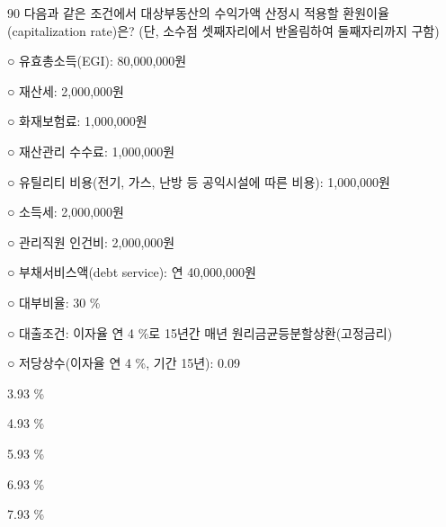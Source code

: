 \begin{question}{90}
다음과 같은 조건에서 대상부동산의 수익가액 산정시 적용할 환원이율(capitalization rate)은? (단, 소수점 셋째자리에서 반올림하여 둘째자리까지 구함)
\begin{framedtext}
○ 유효총소득(EGI): 80,000,000원 \par
○ 재산세: 2,000,000원 \par
○ 화재보험료: 1,000,000원 \par
○ 재산관리 수수료: 1,000,000원 \par
○ 유틸리티 비용(전기, 가스, 난방 등 공익시설에 따른 비용): 1,000,000원 \par
○ 소득세: 2,000,000원 \par
○ 관리직원 인건비: 2,000,000원 \par
○ 부채서비스액(debt service): 연 40,000,000원 \par
○ 대부비율: 30 \% \par
○ 대출조건: 이자율 연 4 \%로 15년간 매년 원리금균등분할상환(고정금리) \par
○ 저당상수(이자율 연 4 \%, 기간 15년): 0.09 \par
\end{framedtext}
\begin{choices}
  \item 3.93 \%
  \item 4.93 \%
  \item 5.93 \%
  \item 6.93 \%
  \item 7.93 \%
\end{choices}
\end{question}
